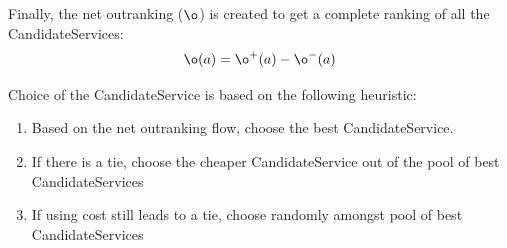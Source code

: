\documentclass[10pt,journal,compsoc]{IEEEtran}
\begin{document}
Finally, the net outranking ($\o$) is created to get a complete ranking of all the CandidateServices:
\begin{equation}
\o(a) = \o^{+}(a) - \o^{-}(a)
\label{net_outranking}
\end{equation}

Choice of the CandidateService is based on the following heuristic:
	\begin{enumerate}
		\item Based on the net outranking flow, choose the best CandidateService. 
		\item If there is a tie, choose the cheaper CandidateService out of the pool of best CandidateServices
		\item If using cost still leads to a tie, choose randomly amongst pool of best CandidateServices
	\end{enumerate}
\end{document}
